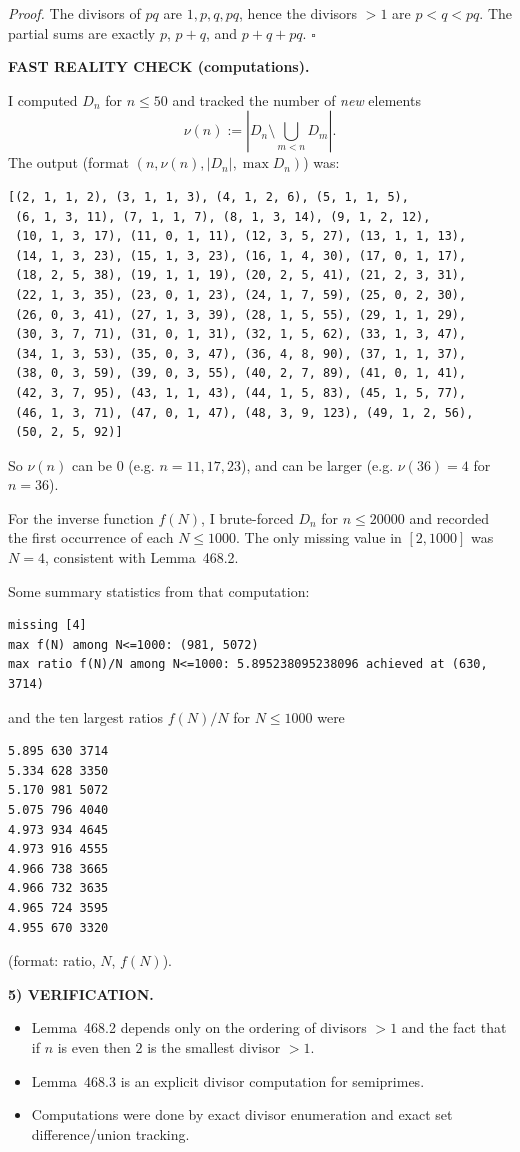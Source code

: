 \textit{Proof.}
The divisors of $pq$ are $1,p,q,pq$, hence the divisors $>1$ are $p<q<pq$. The partial sums are exactly $p$, $p+q$, and $p+q+pq$. \hfill$\square$

\medskip
\noindent\textbf{FAST REALITY CHECK (computations).}

I computed $D_n$ for $n\le 50$ and tracked the number of \emph{new} elements
\[\nu(n):=|D_n\setminus \bigcup_{m<n} D_m|.\]
The output (format $(n,\nu(n),|D_n|,\max D_n)$) was:
\begin{verbatim}
[(2, 1, 1, 2), (3, 1, 1, 3), (4, 1, 2, 6), (5, 1, 1, 5),
 (6, 1, 3, 11), (7, 1, 1, 7), (8, 1, 3, 14), (9, 1, 2, 12),
 (10, 1, 3, 17), (11, 0, 1, 11), (12, 3, 5, 27), (13, 1, 1, 13),
 (14, 1, 3, 23), (15, 1, 3, 23), (16, 1, 4, 30), (17, 0, 1, 17),
 (18, 2, 5, 38), (19, 1, 1, 19), (20, 2, 5, 41), (21, 2, 3, 31),
 (22, 1, 3, 35), (23, 0, 1, 23), (24, 1, 7, 59), (25, 0, 2, 30),
 (26, 0, 3, 41), (27, 1, 3, 39), (28, 1, 5, 55), (29, 1, 1, 29),
 (30, 3, 7, 71), (31, 0, 1, 31), (32, 1, 5, 62), (33, 1, 3, 47),
 (34, 1, 3, 53), (35, 0, 3, 47), (36, 4, 8, 90), (37, 1, 1, 37),
 (38, 0, 3, 59), (39, 0, 3, 55), (40, 2, 7, 89), (41, 0, 1, 41),
 (42, 3, 7, 95), (43, 1, 1, 43), (44, 1, 5, 83), (45, 1, 5, 77),
 (46, 1, 3, 71), (47, 0, 1, 47), (48, 3, 9, 123), (49, 1, 2, 56),
 (50, 2, 5, 92)]
\end{verbatim}
So $\nu(n)$ can be $0$ (e.g. $n=11,17,23$), and can be larger (e.g. $\nu(36)=4$ for $n=36$).

For the inverse function $f(N)$, I brute-forced $D_n$ for $n\le 20000$ and recorded the first occurrence of each $N\le 1000$. The only missing value in $[2,1000]$ was $N=4$, consistent with Lemma~468.2.

Some summary statistics from that computation:
\begin{verbatim}
missing [4]
max f(N) among N<=1000: (981, 5072)
max ratio f(N)/N among N<=1000: 5.895238095238096 achieved at (630, 3714)
\end{verbatim}
and the ten largest ratios $f(N)/N$ for $N\le 1000$ were
\begin{verbatim}
5.895 630 3714
5.334 628 3350
5.170 981 5072
5.075 796 4040
4.973 934 4645
4.973 916 4555
4.966 738 3665
4.966 732 3635
4.965 724 3595
4.955 670 3320
\end{verbatim}
(format: ratio, $N$, $f(N)$).

\medskip
\noindent\textbf{5) VERIFICATION.}

\begin{itemize}
\item Lemma~468.2 depends only on the ordering of divisors $>1$ and the fact that if $n$ is even then $2$ is the smallest divisor $>1$.
\item Lemma~468.3 is an explicit divisor computation for semiprimes.
\item Computations were done by exact divisor enumeration and exact set difference/union tracking.
\end{itemize}

